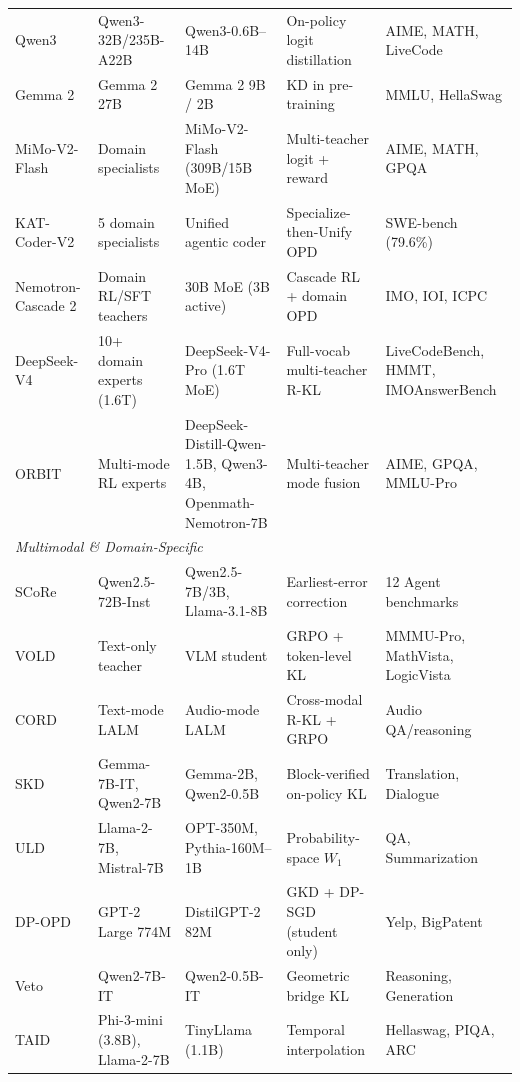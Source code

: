 \documentclass{article} %
\begin{document}
\begin{table}[t]
{\begin{tabular}{@{}lllll@{}}
        Qwen3 \citep{2505.09388} & Qwen3-32B/235B-A22B & Qwen3-0.6B--14B & On-policy logit distillation & AIME, MATH, LiveCode \\
        Gemma 2 \citep{2408.00118} & Gemma 2 27B & Gemma 2 9B / 2B & KD in pre-training & MMLU, HellaSwag \\
        MiMo-V2-Flash \citep{2601.02780} & Domain specialists & MiMo-V2-Flash (309B/15B MoE) & Multi-teacher logit + reward & AIME, MATH, GPQA \\
        KAT-Coder-V2 \citep{2603.27703} & 5 domain specialists & Unified agentic coder & Specialize-then-Unify OPD & SWE-bench (79.6\%) \\
        Nemotron-Cascade 2 \citep{2603.19220} & Domain RL/SFT teachers & 30B MoE (3B active) & Cascade RL + domain OPD & IMO, IOI, ICPC \\
        DeepSeek-V4 \citep{deepseekv4} & 10+ domain experts (1.6T) & DeepSeek-V4-Pro (1.6T MoE) & Full-vocab multi-teacher R-KL & LiveCodeBench, HMMT, IMOAnswerBench \\
        ORBIT \citep{2601.08310} & Multi-mode RL experts & DeepSeek-Distill-Qwen-1.5B, Qwen3-4B, Openmath-Nemotron-7B & Multi-teacher mode fusion & AIME, GPQA, MMLU-Pro \\
        \midrule
        \multicolumn{5}{l}{\textit{Multimodal \& Domain-Specific}} \\
        \midrule
        SCoRe \citep{2509.14257} & Qwen2.5-72B-Inst & Qwen2.5-7B/3B, Llama-3.1-8B & Earliest-error correction & 12 Agent benchmarks \\
        VOLD \citep{2510.23497} & Text-only teacher & VLM student & GRPO + token-level KL & MMMU-Pro, MathVista, LogicVista \\
        CORD \citep{2601.16547} & Text-mode LALM & Audio-mode LALM & Cross-modal R-KL + GRPO & Audio QA/reasoning \\
        SKD \citep{2410.11325} & Gemma-7B-IT, Qwen2-7B & Gemma-2B, Qwen2-0.5B & Block-verified on-policy KL & Translation, Dialogue \\
        ULD \citep{2402.12030} & Llama-2-7B, Mistral-7B & OPT-350M, Pythia-160M--1B & Probability-space $W_1$ & QA, Summarization \\
        DP-OPD \citep{2604.04461} & GPT-2 Large 774M & DistilGPT-2 82M & GKD + DP-SGD (student only) & Yelp, BigPatent \\
        Veto \citep{2601.07155} & Qwen2-7B-IT & Qwen2-0.5B-IT & Geometric bridge KL & Reasoning, Generation \\
        TAID \citep{2501.16937} & Phi-3-mini (3.8B), Llama-2-7B & TinyLlama (1.1B) & Temporal interpolation & Hellaswag, PIQA, ARC \\

\end{tabular}}
\end{table}
\end{document}
